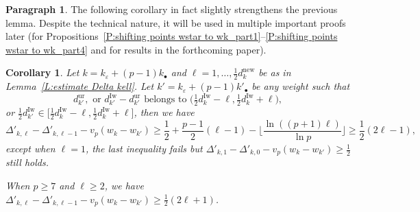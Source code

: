 \documentclass[12pt]{amsart}
\newtheorem{corollary}[subsection]{Corollary}
\theoremstyle{definition}
\newtheorem{para}[subsection]{Paragraph}
\numberwithin{equation}{subsection}
\newcommand{\new}{\mathrm{new}}
\newcommand{\Iw}{\mathrm{Iw}}
\newcommand{\ur}{\mathrm{ur}}
\begin{document}
\begin{para}
\label{P:para_155}
The following corollary in fact slightly strengthens the previous lemma. Despite the technical nature, it will be used in multiple important proofs later (for Propositions~\ref{P:shifting points wstar to wk_part1}--\ref{P:shifting points wstar to wk_part4} and for results in the forthcoming paper).
\end{para}
\begin{corollary}
\label{C:finer inequality for Delta}
Let $k = k_\varepsilon + (p-1)k_\bullet$ and $\ell =1, \dots, \frac 12 d_k^\new$ be as in Lemma~\ref{L:estimate Delta kell}. Let $k' = k_\varepsilon + (p-1) k'_\bullet$ 
be any weight such that 
\begin{equation}
\label{E:dk' boundaries belongs to NS range} 
d_{k'}^\ur, \textrm{ or }d_{k'}^\Iw - d_{k'}^\ur\textrm{  belongs to }\big(\tfrac 12d_k^\Iw-\ell, \tfrac 12 d_k^\Iw+\ell\big)
,
\end{equation}
or $\frac 12d_{k'}^\Iw \in \big[\tfrac 12d_k^\Iw-\ell, \tfrac 12 d_k^\Iw+\ell\big]$,
then we have
\begin{equation}
\label{E:Delta kl difference strong}
\Delta'_{k, \ell} - \Delta'_{k,\ell-1} -v_p(w_k - w_{k'}) \geq \frac 12 + \frac {p-1}2(\ell-1) -\Big \lfloor \frac{\ln((p+1) \ell)}{\ln p}\Big\rfloor  \geq \frac 12 (2\ell-1),
\end{equation}
except when $\ell = 1$, the last inequality fails but $\Delta'_{k, 1} - \Delta'_{k,0} - v_p(w_{k} - w_{k'}) \geq \frac 12$ still holds.

When $p \geq 7$ and $\ell \geq 2$, we have
$\Delta'_{k, \ell} - \Delta'_{k,\ell-1}-v_p(w_{k}-w_{k'}) \geq \frac 12(2\ell+1)$.
\end{corollary}
\end{document}
